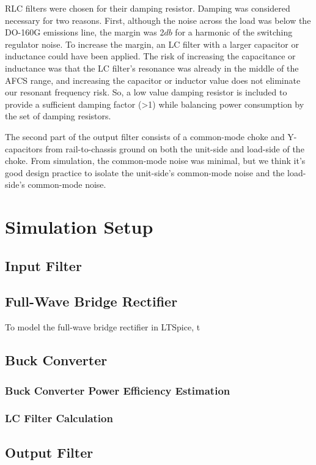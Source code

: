 \documentclass[conference]{IEEEtran}
\begin{document}
RLC filters were chosen for their damping resistor. Damping was considered necessary for two reasons. First, although the noise across the load was below the DO-160G emissions line, the margin was 2${db}$ for a harmonic of the switching regulator noise. To increase the margin, an LC filter with a larger capacitor or inductance could have been applied. The risk of increasing the capacitance or inductance was that the LC filter's resonance was already in the middle of the AFCS range, and increasing the capacitor or inductor value does not eliminate our resonant frequency risk. So, a low value damping resistor is included to provide a sufficient damping factor (>1) while balancing power consumption by the set of damping resistors.

The second part of the output filter consists of a common-mode choke and Y-capacitors from rail-to-chassis ground on both the unit-side and load-side of the choke. From simulation, the common-mode noise was minimal, but we think it's good design practice to isolate the unit-side's common-mode noise and the load-side's common-mode noise.

\section{Simulation Setup}

\subsection{Input Filter}

\subsection{Full-Wave Bridge Rectifier}
To model the full-wave bridge rectifier in LTSpice, t

\subsection{Buck Converter}
\subsubsection{Buck Converter Power Efficiency Estimation}
\subsubsection{LC Filter Calculation}
\subsection{Output Filter}
\end{document}
